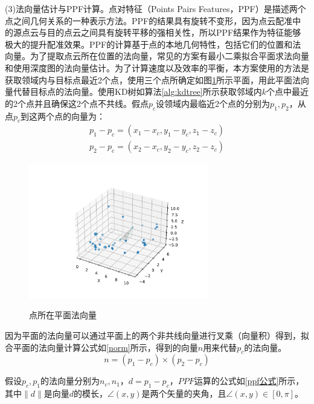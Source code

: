 (3)法向量估计与PPF计算。点对特征（Points Pairs Features，PPF）\cite{hinterstoisser2016going}是描述两个点之间几何关系的一种表示方法。PPF的结果具有旋转不变形，因为点云配准中的源点云与目的点云之间具有旋转平移的强相关性\cite{5540108}，所以PPF结果作为特征能够极大的提升配准效果。PPF的计算基于点的本地几何特性，包括它们的位置和法向量。为了提取点云所在位置的法向量，常见的方案有最小二乘拟合平面求法向量和使用深度图的法向量估计。为了计算速度以及效率的平衡，本方案使用的方法是获取领域内与目标点最近2个点，使用三个点所确定如图\ref{三点平面法向量}所示平面，用此平面法向量代替目标点的法向量。使用KD树如算法\ref{alg:kdtree}所示获取邻域内$k$个点中最近的2个点并且确保这2个点不共线。假点$p_c$设领域内最临近2个点的分别为$p_1,p_2$，从点$p_c$到这两个点的向量为：
\begin{equation}
	\begin{split}
		p_1 - p_c = (x_1 - x_c, y_1 - y_c,z_1 - z_c)\\
		p_2 - p_c = (x_2 - x_c, y_2 - y_c,z_2 - z_c)
	\end{split}
\end{equation}

\begin{figure}[htbp]
	\centering
	\includegraphics[width=0.7\textwidth]{figures/三点法向量.pdf}\\
	\caption{点所在平面法向量}
	\label{三点平面法向量}
\end{figure}

因为平面的法向量可以通过平面上的两个非共线向量进行叉乘（向量积）得到，拟合平面的法向量计算公式如\eqref{norm}所示，得到的向量$n$用来代替$p_c$的法向量。
\begin{equation}
	\label{norm}
	n = (p_1 - p_c) \times(p_2 - p_c) 
\end{equation}

假设$p_c,p_1$的法向量分别为$n_c,n_1$，$d = p_1-p_c$，$PPF$运算的公式如\eqref{ppf公式}所示，其中$\|d\|$是向量$d$的模长，$\angle(x, y)$是两个矢量的夹角，且$\angle(x, y) \in [0, \pi]$。

